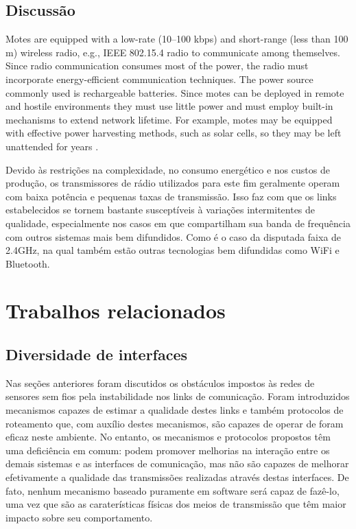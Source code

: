 \documentclass[
	12pt,				%
	openright,			%
	oneside,
	a4paper,			%
	english,			%
	french,				%
	spanish,			%
	brazil				%
	]{abntex2}
\begin{document}
\section{Discussão}
Motes are equipped with a low-rate (10–100 kbps) and short-range (less than 100 m) wireless radio, e.g., IEEE 802.15.4 radio to communicate among themselves. 
Since radio communication consumes most of the power, the radio must incorporate energy-efficient communication techniques.
The power source commonly used is rechargeable batteries.
Since motes can be deployed in remote and hostile environments they must use little power and must employ built-in mechanisms to extend network lifetime.
For example, motes may be equipped with effective power harvesting methods, such as solar cells, so they may be left unattended for years \cite{Rawat2014}.

Devido às restrições na complexidade, no consumo energético e nos custos de produção, os transmissores de rádio utilizados para este fim geralmente operam com baixa potência e pequenas taxas de transmissão. Isso faz com que os links estabelecidos se tornem bastante susceptíveis à variações intermitentes de qualidade, especialmente nos casos em que compartilham sua banda de frequência com outros sistemas mais bem difundidos. Como é o caso da disputada faixa de 2.4GHz, na qual também estão outras tecnologias bem difundidas como WiFi e Bluetooth.


\chapter{Trabalhos relacionados}
\section{Diversidade de interfaces}

Nas seções anteriores foram discutidos os obstáculos impostos às redes de sensores sem fios pela instabilidade nos links de comunicação. Foram introduzidos mecanismos capazes de estimar a qualidade destes links e também protocolos de roteamento que, com auxílio destes mecanismos, são capazes de operar de foram eficaz neste ambiente. No entanto, os mecanismos e protocolos propostos têm uma deficiência em comum: podem promover melhorias na interação entre os demais sistemas e as interfaces de comunicação, mas não são capazes de melhorar efetivamente a qualidade das transmissões realizadas através destas interfaces. De fato, nenhum mecanismo baseado puramente em software será capaz de fazê-lo, uma vez que são as caraterísticas físicas dos meios de transmissão que têm maior impacto sobre seu comportamento.
\end{document}
